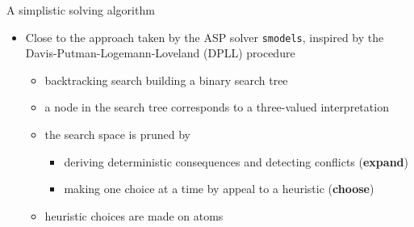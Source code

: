 \begin{frame}{A simplistic solving algorithm}
\bigskip
\begin{itemize}
  \item Close to the approach taken by the ASP solver \texttt{smodels},
    inspired by the Davis-Putman-Logemann-Loveland (DPLL) procedure
    \smallskip
  \begin{itemize}\normalsize
  \item<2-> backtracking search building a binary search tree
  \item<2-> a node in the search tree corresponds to a three-valued interpretation
    \smallskip
  \item<3-> the search space is pruned by
    \begin{itemize}\normalsize
    \item deriving deterministic consequences and detecting conflicts (\textbf{expand})
    \item making one choice at a time by appeal to a heuristic (\textbf{choose})
    \end{itemize}
    \smallskip
  \item<4-> heuristic choices are made on atoms
  \end{itemize}
\end{itemize}
\end{frame}
%
